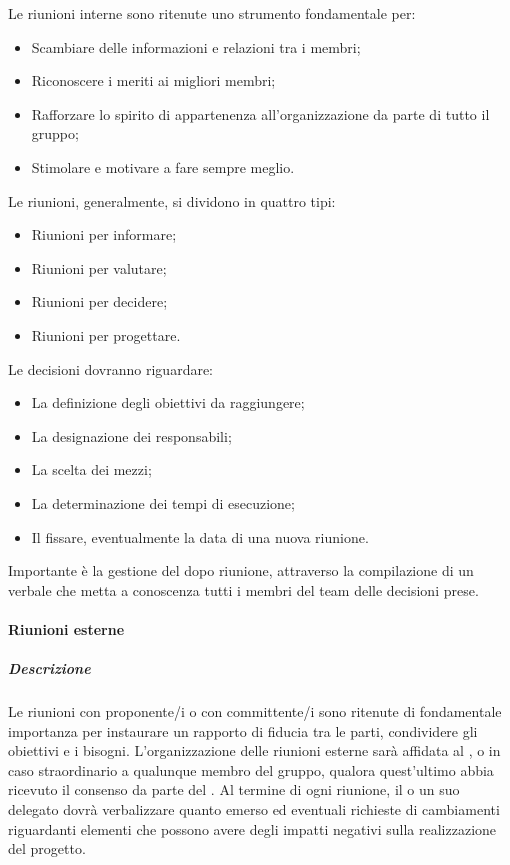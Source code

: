 Le riunioni interne sono ritenute uno strumento fondamentale per:
\begin{itemize}
\item
Scambiare delle informazioni e relazioni tra i membri;
\item
Riconoscere  i  meriti  ai  migliori membri;
\item
Rafforzare lo spirito di appartenenza all'organizzazione da parte di tutto il gruppo;
\item
Stimolare e motivare a fare sempre meglio.
\end{itemize}

Le riunioni, generalmente, si dividono in quattro tipi:
\begin{itemize}
\item
Riunioni per informare;
\item 
Riunioni per valutare;
\item
Riunioni per decidere;
\item 
Riunioni per progettare. 
\end{itemize}

Le decisioni dovranno riguardare:
\begin{itemize}
\item
La definizione degli obiettivi da raggiungere;
\item 
La designazione dei responsabili;
\item
La scelta dei mezzi;
\item
La determinazione dei tempi di esecuzione;
\item
Il fissare, eventualmente la data di una nuova riunione.
\end{itemize}

Importante è la gestione del dopo riunione, attraverso la compilazione di un verbale che metta a conoscenza tutti i membri del team delle decisioni prese.

\paragraph{Riunioni esterne}
\subparagraph{Descrizione}
Le riunioni con proponente/i o con committente/i sono ritenute di fondamentale importanza per instaurare un rapporto di fiducia tra le parti, condividere gli obiettivi e i bisogni.
L'organizzazione delle riunioni esterne sarà affidata al \textsl{\RdP}, o in caso straordinario a qualunque membro del gruppo, qualora quest'ultimo abbia ricevuto il consenso da parte del \textsl{\RdP}.
Al termine di ogni riunione, il \textsl{\RdP} o un suo delegato dovrà verbalizzare quanto emerso ed eventuali richieste di cambiamenti riguardanti elementi che possono avere degli impatti negativi sulla realizzazione del progetto.

